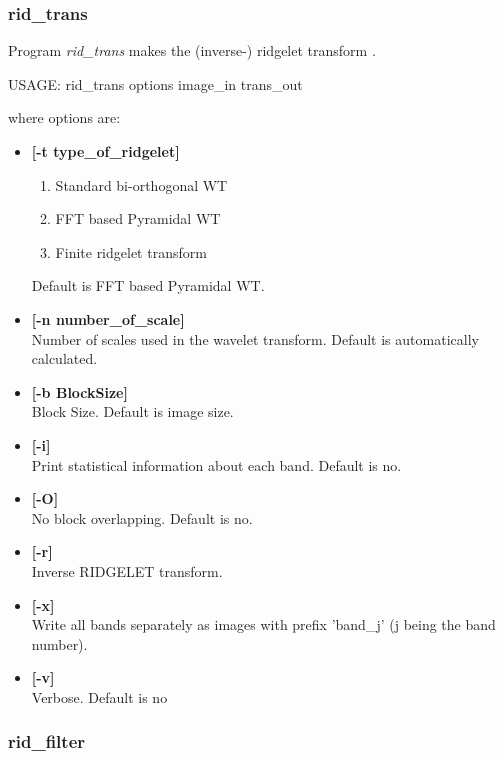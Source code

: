 \documentclass[11pt,a4paper]{article}
\begin{document}
\subsubsection{rid\_trans}

Program {\em rid\_trans} makes the (inverse-) ridgelet transform .
\begin{center}
 USAGE:  rid\_trans options image\_in trans\_out
\end{center}
where options are:

\begin{itemize}
\item {\bf [-t type\_of\_ridgelet]} \\
\begin{enumerate}
\item Standard bi-orthogonal WT
\item FFT based Pyramidal WT  
\item Finite ridgelet transform
\end{enumerate}
Default is FFT based Pyramidal WT.

\item {\bf [-n number\_of\_scale]} \\
 Number of scales used in the wavelet transform.
 Default is automatically calculated.
\item {\bf [-b BlockSize]} \\
Block Size. Default is image size.
\item {\bf [-i]} \\
Print statistical information about each band. Default is no. 
\item {\bf [-O]} \\
 No block overlapping. Default is no. 
\item {\bf [-r]} \\
Inverse RIDGELET transform.
\item {\bf [-x]} \\
 Write all bands separately as images with prefix 'band\_j' 
(j being the band number).
\item {\bf [-v]} \\
Verbose. Default is no
\end{itemize}


\subsubsection{rid\_filter}
\end{document}
